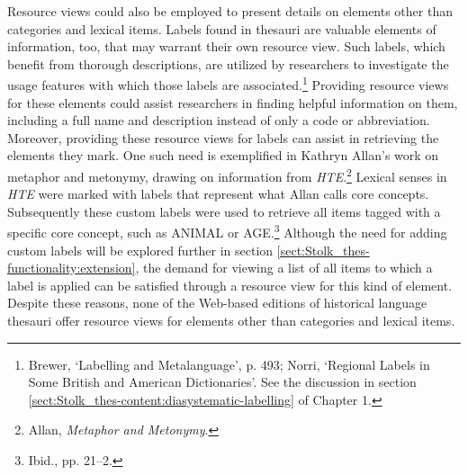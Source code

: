 Resource views could also be employed to present details on elements other than categories and lexical items. Labels found in thesauri are valuable elements of information, too, that may warrant their own resource view. Such labels, which benefit from thorough descriptions, are utilized by researchers to investigate the usage features with which those labels are associated.\footnote{Brewer, `Labelling and Metalanguage', %
p. 493; Norri, `Regional Labels in Some British and American Dictionaries'. %
See the discussion in section \ref{sect:Stolk_thes-content:diasystematic-labelling} of Chapter 1.} Providing resource views for these elements could assist researchers in finding helpful information on them, including a full name and description instead of only a code or abbreviation. Moreover, providing these resource views for labels can assist in retrieving the elements they mark. One such need is exemplified in Kathryn Allan's work on metaphor and metonymy, drawing on information from \textit{HTE}.\footnote{Allan, \textit{Metaphor and Metonymy}.} Lexical senses in \textit{HTE} were marked with labels that represent what Allan calls core concepts. Subsequently these custom labels were used to retrieve all items tagged with a specific core concept, such as ANIMAL or AGE.\footnote{Ibid., pp. 21–2.} Although the need for adding custom labels will be explored further in section \ref{sect:Stolk_thes-functionality:extension}, the demand for viewing a list of all items to which a label is applied can be satisfied through a resource view for this kind of element. Despite these reasons, none of the Web-based editions of historical language thesauri offer resource views for elements other than categories and lexical items. 


